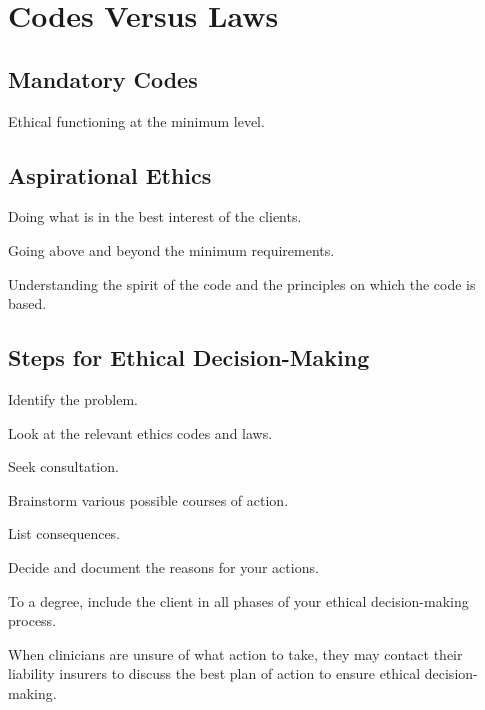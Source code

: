 \section{Codes Versus Laws}

\subsection{Mandatory Codes}

\begin{coloredlist}
    \item Ethical functioning at the minimum level.
\end{coloredlist}

\subsection{Aspirational Ethics}

\begin{coloredlist}
    \item Doing what is in the best interest of the clients.
    \item Going above and beyond the minimum requirements.
    \item Understanding the spirit of the code and the principles on which the code is based.
\end{coloredlist}

\subsection{Steps for Ethical Decision-Making}

\begin{coloredlist}
    \item Identify the problem.
    \item Look at the relevant ethics codes and laws.
    \item Seek consultation.
    \item Brainstorm various possible courses of action.
    \item List consequences.
    \item Decide and document the reasons for your actions.
    \item To a degree, include the client in all phases of your ethical decision-making process.
    \item When clinicians are unsure of what action to take, they may contact their liability insurers to discuss the best plan of action to ensure ethical decision-making.
\end{coloredlist}

